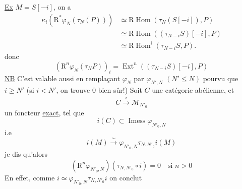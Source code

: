 \uline{Ex} \(M=S[-i]\), on a
\[
\begin{aligned}
\kappa_i(\mathrm R^*\varphi_N(\tau_N(P)))
 &\simeq\mathrm R\operatorname{Hom}(\tau_N(S[-i]),P)\\
 &\simeq\mathrm R\operatorname{Hom}((\tau_{N-i}S)[-i],P)\\
 &\simeq\mathrm R\operatorname{Hom}^i(\tau_{N-i}S,P).
\end{aligned}
\]
donc
\[
(\mathrm R^n\varphi_N(\tau_NP))_i
 =\operatorname{Ext}^n((\tau_{N-i}S)[-i],P)
\]
\uline{NB} C'est valable aussi en remplaçant \(\varphi_N\) par
\(\varphi_{N',N}\) \((N'\leq N)\) pourvu que \(i\geq N'\)
(si \(i<N'\), on trouve \(0\) bien sûr!)
Soit \(C\) une catégorie abélienne, et
\[C\overset{i}\longrightarrow\mathcal M_{N'_0}\]
un foncteur \uline{exact}, tel que
\[i(C)\subset\operatorname{Imess}\varphi_{N'_0,N}\]
i.e
\[
i(M)\overset\sim\longrightarrow\varphi_{N'_0,N}\tau_{N,N'_0}i(M)
\]
je dis qu'alors
\[
(\mathrm R^n\varphi_{N'_0,N})(\tau_{N,N'_0}\circ i)=0
 \quad\text{si }n>0
\]
En effet, comme \(i\simeq\varphi_{N'_0,N}\tau_{N,N'_0}i\)
on conclut
